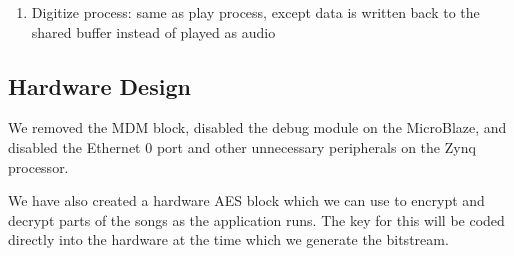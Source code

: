 \documentclass[11pt]{extarticle}
\begin{document}
\begin{enumerate}
    \item Digitize process: same as play process, except data is written back to the shared buffer instead of played as audio
\end{enumerate}


\subsection{Hardware Design}
We removed the MDM block, disabled the debug module on the MicroBlaze, and disabled the Ethernet 0 port and other unnecessary peripherals on the Zynq processor.

We have also created a hardware AES block which we can use to encrypt and decrypt parts of the songs as the application runs.
The key for this will be coded directly into the hardware at the time which we generate the bitstream.
\end{document}
